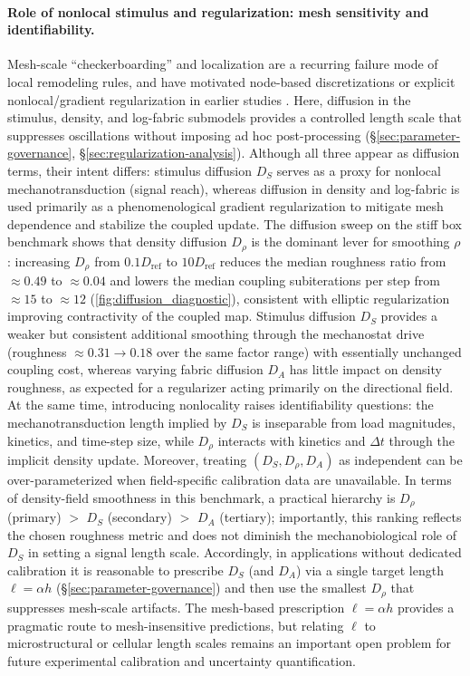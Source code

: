 \paragraph{Role of nonlocal stimulus and regularization: mesh sensitivity and identifiability.}
Mesh-scale ``checkerboarding'' and localization are a recurring failure mode of local remodeling rules, and have motivated node-based discretizations or explicit nonlocal/gradient regularization in earlier studies \cite{Jacobs1995_NumericalInstabilitiesBone,Peerlings1998}.
Here, diffusion in the stimulus, density, and log-fabric submodels provides a controlled length scale that suppresses oscillations without imposing ad hoc post-processing (\S\ref{sec:parameter-governance}, \S\ref{sec:regularization-analysis}).
Although all three appear as diffusion terms, their intent differs: stimulus diffusion $D_S$ serves as a proxy for nonlocal mechanotransduction (signal reach), whereas diffusion in density and log-fabric is used primarily as a phenomenological gradient regularization to mitigate mesh dependence and stabilize the coupled update.
The diffusion sweep on the stiff box benchmark shows that density diffusion $D_\rho$ is the dominant lever for smoothing $\rho$: increasing $D_\rho$ from $0.1D_{\mathrm{ref}}$ to $10D_{\mathrm{ref}}$ reduces the median roughness ratio from $\approx 0.49$ to $\approx 0.04$ and lowers the median coupling subiterations per step from $\approx 15$ to $\approx 12$ (\cref{fig:diffusion_diagnostic}), consistent with elliptic regularization improving contractivity of the coupled map.
Stimulus diffusion $D_S$ provides a weaker but consistent additional smoothing through the mechanostat drive (roughness $\approx 0.31\to 0.18$ over the same factor range) with essentially unchanged coupling cost, whereas varying fabric diffusion $D_A$ has little impact on density roughness, as expected for a regularizer acting primarily on the directional field.
At the same time, introducing nonlocality raises identifiability questions: the mechanotransduction length implied by $D_S$ is inseparable from load magnitudes, kinetics, and time-step size, while $D_\rho$ interacts with kinetics and $\Delta t$ through the implicit density update.
Moreover, treating $(D_S,D_\rho,D_A)$ as independent can be over-parameterized when field-specific calibration data are unavailable.
In terms of density-field smoothness in this benchmark, a practical hierarchy is $D_\rho$ (primary) $>$ $D_S$ (secondary) $>$ $D_A$ (tertiary); importantly, this ranking reflects the chosen roughness metric and does not diminish the mechanobiological role of $D_S$ in setting a signal length scale.
Accordingly, in applications without dedicated calibration it is reasonable to prescribe $D_S$ (and $D_A$) via a single target length $\ell=\alpha h$ (\S\ref{sec:parameter-governance}) and then use the smallest $D_\rho$ that suppresses mesh-scale artifacts.
The mesh-based prescription $\ell=\alpha h$ provides a pragmatic route to mesh-insensitive predictions, but relating $\ell$ to microstructural or cellular length scales remains an important open problem for future experimental calibration and uncertainty quantification.

